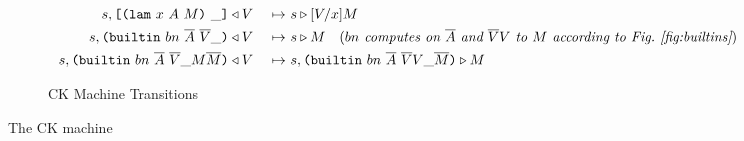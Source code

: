\documentclass[../plutus-core-specification.tex]{subfiles}
\begin{document}
\begin{figure}[H]
\begin{subfigure}[c]{\linewidth}
\begin{minipage}{\linewidth}
\begin{alignat*}{2}
  s,\texttt{[} \texttt{(} \texttt{lam} ~ x ~ A ~ M \texttt{)} ~ \_ \texttt{]} &\triangleleft V
                                            &~\mapsto~&  s \triangleright [V/x]M\\
  s,\texttt{(} \texttt{builtin} ~ bn ~ \overline{A} ~ \overline{V} \_  \texttt{)} &\triangleleft V
                                            &~\mapsto~& s \triangleright M
                                              \quad (\textit{$bn$ computes on $\overline{A}$ and $\overline{V}V$
                                              to $M$ according to Fig.~\ref{fig:builtins}})\\
  s,\texttt{(} \texttt{builtin} ~ bn ~ \overline{A} ~ \overline{V} \_ M \overline{M} \texttt{)} & \triangleleft V
                                            &~\mapsto~& s,\texttt{(} \texttt{builtin} ~ bn ~ \overline{A} ~ \overline{V} V \_ \overline{M} \texttt{)} \triangleright M\\
    \end{alignat*}
\end{minipage}
    \caption{CK Machine Transitions}
    \label{fig:ck-transitions}
\end{subfigure}
\caption{The CK machine}
\label{fig:ck-machine}
\end{figure}
\end{document}
